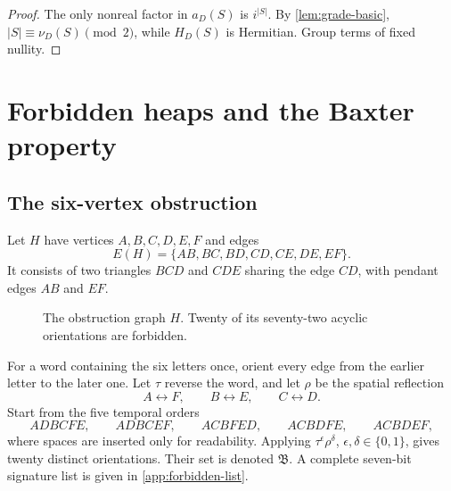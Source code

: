 \documentclass[10pt,letterpaper]{article}
\begin{document}
\begin{proof}
The only nonreal factor in \(a_D(S)\) is \(i^{|S|}\).  By \cref{lem:grade-basic}, \(|S|\equiv\nu_D(S)\pmod2\), while \(H_D(S)\) is Hermitian.  Group terms of fixed nullity.
\end{proof}

\section{Forbidden heaps and the Baxter property}\label{sec:forbidden}

\subsection{The six-vertex obstruction}

Let \(H\) have vertices \(A,B,C,D,E,F\) and edges
\begin{equation}\label{eq:H-edges}
 E(H)=\{AB,BC,BD,CD,CE,DE,EF\}.
\end{equation}
It consists of two triangles \(BCD\) and \(CDE\) sharing the edge \(CD\), with pendant edges \(AB\) and \(EF\).

\begin{figure}[t]
\centering
{}
\caption{The obstruction graph \(H\).  Twenty of its seventy-two acyclic orientations are forbidden.}
\label{fig:H-obstruction}
\end{figure}

For a word containing the six letters once, orient every edge from the earlier letter to the later one.  Let \(\tau\) reverse the word, and let \(\rho\) be the spatial reflection
\[
 A\leftrightarrow F,
 \qquad B\leftrightarrow E,
 \qquad C\leftrightarrow D.
\]
Start from the five temporal orders
\begin{equation}\label{eq:H-reps}
 ADB CFE,
 \qquad ADB CEF,
 \qquad ACB FED,
 \qquad ACB DFE,
 \qquad ACB DEF,
\end{equation}
where spaces are inserted only for readability.  Applying \(\tau^\epsilon\rho^\delta\), \(\epsilon,\delta\in\{0,1\}\), gives twenty distinct orientations.  Their set is denoted \(\mathfrak B\).  A complete seven-bit signature list is given in \cref{app:forbidden-list}.
\end{document}
